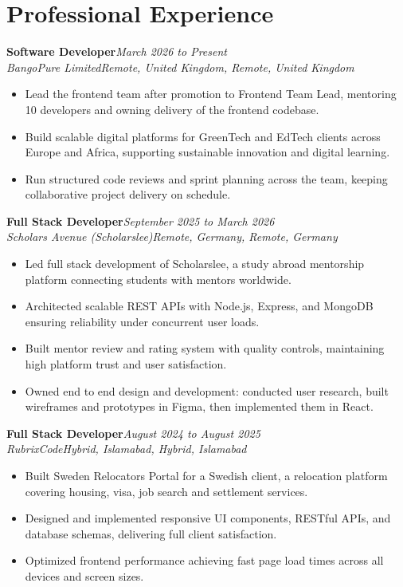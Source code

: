 \documentclass[11pt,letterpaper]{article}
\newcommand{\entry}[4]{%
  \textbf{#1}\hfill\textit{#2}\\
  \textit{#3\ifx\relax#4\relax\else, #4\fi}\\[0.14em]}
\begin{document}
\section{Professional Experience}
\entry{Software Developer}{March 2026 to Present}{BangoPure Limited}{Remote, United Kingdom}
\begin{itemize}
  \item Lead the frontend team after promotion to Frontend Team Lead, mentoring 10 developers and owning delivery of the frontend codebase.
  \item Build scalable digital platforms for GreenTech and EdTech clients across Europe and Africa, supporting sustainable innovation and digital learning.
  \item Run structured code reviews and sprint planning across the team, keeping collaborative project delivery on schedule.
\end{itemize}\vspace{0.4em}
\entry{Full Stack Developer}{September 2025 to March 2026}{Scholars Avenue (Scholarslee)}{Remote, Germany}
\begin{itemize}
  \item Led full stack development of Scholarslee, a study abroad mentorship platform connecting students with mentors worldwide.
  \item Architected scalable REST APIs with Node.js, Express, and MongoDB ensuring reliability under concurrent user loads.
  \item Built mentor review and rating system with quality controls, maintaining high platform trust and user satisfaction.
  \item Owned end to end design and development: conducted user research, built wireframes and prototypes in Figma, then implemented them in React.
\end{itemize}\vspace{0.4em}
\entry{Full Stack Developer}{August 2024 to August 2025}{RubrixCode}{Hybrid, Islamabad}
\begin{itemize}
  \item Built Sweden Relocators Portal for a Swedish client, a relocation platform covering housing, visa, job search and settlement services.
  \item Designed and implemented responsive UI components, RESTful APIs, and database schemas, delivering full client satisfaction.
  \item Optimized frontend performance achieving fast page load times across all devices and screen sizes.
\end{itemize}
\end{document}
